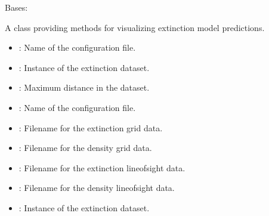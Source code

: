 \documentclass[letterpaper,10pt,english]{sphinxmanual}
\begin{document}
\begin{fulllineitems}
\label{\detokenize{Visualizer:Visualizer.Visualizer}}
\pysigstartsignatures
{}
\pysigstopsignatures
\sphinxAtStartPar
Bases: 

\sphinxAtStartPar
A class providing methods for visualizing extinction model predictions.
\begin{description}
\begin{itemize}
\item {} 
\sphinxAtStartPar
{}: Name of the configuration file.

\item {} 
\sphinxAtStartPar
{}: Instance of the extinction dataset.

\item {} 
\sphinxAtStartPar
{}: Maximum distance in the dataset.

\end{itemize}

\begin{itemize}
\item {} 
\sphinxAtStartPar
{}: Name of the configuration file.

\item {} 
\sphinxAtStartPar
{}: Filename for the extinction grid data.

\item {} 
\sphinxAtStartPar
{}: Filename for the density grid data.

\item {} 
\sphinxAtStartPar
{}: Filename for the extinction line\sphinxhyphen{}of\sphinxhyphen{}sight data.

\item {} 
\sphinxAtStartPar
{}: Filename for the density line\sphinxhyphen{}of\sphinxhyphen{}sight data.

\item {} 
\sphinxAtStartPar
{}: Instance of the extinction dataset.


\end{itemize}
\end{description}
\end{fulllineitems}
\end{document}
